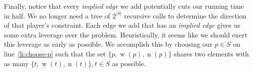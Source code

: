 \documentclass{article}
\DeclareMathOperator{\w}{w}
\DeclareMathOperator{\n}{n}
\DeclareMathOperator{\pairs}{pairs}
\begin{document}
Finally, notice that every \emph{implied edge} we add potentially cuts our running time in half. We no longer need a tree of $2^{\lvert S \rvert}$ recursive calls to determine the direction of that player's constraint. Each edge we add that has an \emph{implied edge} gives us some extra leverage over the problem. Heuristically, it seems like we should exert this leverage as early as possible. We accomplish this by choosing our $p\in S$ on line~\ref{li:choose-p} such that the set $\{p,\w(p), \n(p)\}$ shares two elements with as many $\{t, \w(t), \n(t)\}, t\in S$ as possible.
\begin{comment}
Let $P$ be the set of $n$ players.\\
Let $R$ be a set of $n$ triplets $(x,y,z)$ where $y=\w(x), z=\n(x)$, $x,y,z \in P$. \\ %
Let $\pairs((x,y,z)) = \{(x,y),(x,z),(y,z),(y,x),(z,x),(z,y)\}$\\
Let $A = \bigcup\limits_{r\in R} \pairs(r)$\\
Let $G = (V,E)$ be a directed graph, where $V \subseteq P$. We interpret an edge $(a,b) \in E$ to represent the statement `$a$ appears to the left of $b$ in a (one-dimensional) solution to the Ninja Assassin Wonderwall problem on $R$.' \\

\begin{codebox}
\Procname{$\proc{FindOrdering}(R)$}
\li Let $(a,b) \in A$. 
\li $G \gets (\emptyset, \emptyset)$
\li $ReverseChecked \gets \const{True}$
\li $G \gets \proc{MakeAssumption}(G, (a,b), R, ReverseChecked)$
\li \If $G$ is acyclic:
\li \Do
        \kw{output} $\proc{TopologicalSort}(G)$
\li \Else
        \kw{output} ``No ordering exists"
    \End
\end{codebox}

\begin{codebox}
\Procname{$\proc{MakeAssumption}(G, pair, R, ReverseChecked)$}
\li $W \gets G$ \Comment W is a working copy of G
\li $Q \gets \emptyset$
\li $\proc{Enqueue}(Q,pair)$
\li \While $\attrib{Q}{length} > 0$ 
\li \Do
        $(a,b) \gets \proc{Dequeue}(Q)$
\li     $\attrib{W}{E} \gets \attrib{W}{E} \cup \{(a,b)\}$
\li     Add to $W$ and $Q$ every edge (not already in $W$) that is implied by the edge $(a,b)$
\zi  \Comment e.g. If $(a,b) \in \attrib{W}{E}$ and $(a,b,c) \in R$, add edge $(b,c)$
\li     Add to $W$ and $Q$ the edges (not already in $W$) implied by the Transitive property.
\zi  \Comment e.g. If $(a,b),(b,c) \in \attrib{W}{E}$, add edge $(a,c)$
    \End %
\li \If $W$ is acyclic
\li \Do
        \If $\attrib{W}{V} \isequal P$
\li     \Do
            \Return $W$ \Comment Success!
\li        \Else
\li         Let $(a,b) \in A \setminus \attrib{W}{E}$. \Comment Make another guess.
\li         $ReverseChecked \gets \const{false}$
\li         \Return $\proc{MakeAssumption}(W,(a,b), R, ReverseChecked)$
        \End
\li \ElseIf not $ReverseChecked$
\li \Do
        Let $(a,b) = pair$.
\li     $ReverseCheceked = \const{true}$
\li     \Return $\proc{MakeAssumption}(G, (b,a), R, ReverseChecked)$
\li \Else
        \Return $W$ \Comment both (a,b) and (b,a) lead to a contradiction. No solution.
    \End
\end{codebox} 


\end{comment}
\end{document}
